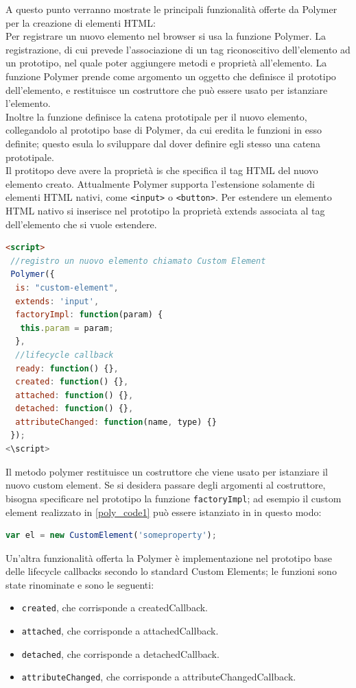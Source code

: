 A questo punto verranno mostrate le principali funzionalità offerte da Polymer per la creazione di elementi HTML:
\\
Per registrare un nuovo elemento nel browser si usa la funzione Polymer. La registrazione, di cui  prevede l’associazione di un tag riconoscitivo dell’elemento ad un prototipo, nel quale poter aggiungere metodi e proprietà all’elemento. La funzione Polymer prende come argomento un oggetto che definisce il prototipo dell’elemento, e restituisce un costruttore che può essere usato per istanziare l’elemento.
\\
Inoltre la funzione definisce la catena prototipale per il nuovo elemento, collegandolo al prototipo base di Polymer, da cui eredita le funzioni in esso definite; questo esula lo sviluppare dal dover definire egli stesso una catena prototipale.
\\
Il protitopo deve avere la proprietà is che specifica il tag HTML del nuovo elemento creato. Attualmente Polymer supporta l’estensione solamente di elementi HTML nativi, come \texttt{<input>} o \texttt{<button>}. Per estendere un elemento HTML nativo si inserisce nel prototipo la proprietà extends associata al tag dell’elemento che si vuole estendere. 
\begin{lstlisting}[language=html, label={poly_code1}]
<script>
 //registro un nuovo elemento chiamato Custom Element
 Polymer({
  is: "custom-element",
  extends: 'input',
  factoryImpl: function(param) {
   this.param = param;
  },
  //lifecycle callback
  ready: function() {},
  created: function() {},
  attached: function() {},
  detached: function() {},
  attributeChanged: function(name, type) {}
 });
<\script>
\end{lstlisting}
Il metodo polymer restituisce un costruttore che viene usato per istanziare il nuovo custom element. Se si desidera passare degli argomenti al costruttore, bisogna specificare nel prototipo la funzione \texttt{factoryImpl}; ad esempio il custom element realizzato in \ref{poly_code1} può essere istanziato in in questo modo:
\begin{lstlisting}[language=javascript]
var el = new CustomElement('someproperty');
\end{lstlisting}
Un’altra funzionalità offerta la Polymer è implementazione nel prototipo base delle lifecycle callbacks secondo lo standard Custom Elements; le funzioni sono state rinominate e sono le seguenti:
\begin{itemize}
\item \texttt{created}, che corrisponde a createdCallback.
\item \texttt{attached}, che corrisponde a attachedCallback.
\item \texttt{detached}, che corrisponde a detachedCallback.
\item \texttt{attributeChanged}, che corrisponde a attributeChangedCallback.
\end{itemize}
